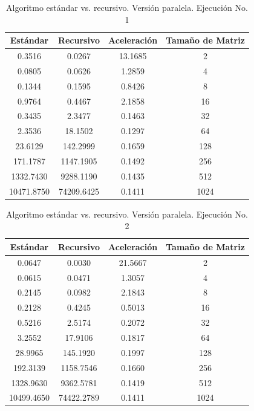 \documentclass{article}
\begin{document}
\begin{table}[ht]
\centering
\begin{tabular}{|c|c|c|c|}
\hline
\textbf{Estándar} & \textbf{Recursivo} & \textbf{Aceleración} & \textbf{Tamaño de Matriz} \\
\hline
0.3516 & 0.0267 & 13.1685 & 2 \\
0.0805 & 0.0626 & 1.2859 & 4 \\
0.1344 & 0.1595 & 0.8426 & 8 \\
0.9764 & 0.4467 & 2.1858 & 16 \\
0.3435 & 2.3477 & 0.1463 & 32 \\
2.3536 & 18.1502 & 0.1297 & 64 \\
23.6129 & 142.2999 & 0.1659 & 128 \\
171.1787 & 1147.1905 & 0.1492 & 256 \\
1332.7430 & 9288.1190 & 0.1435 & 512 \\
10471.8750 & 74209.6425 & 0.1411 & 1024 \\
\hline
\end{tabular}
\caption{Algoritmo estándar vs. recursivo. Versión paralela. Ejecución No. 1}
\end{table}

\begin{table}[ht]
\centering
\begin{tabular}{|c|c|c|c|}
\hline
\textbf{Estándar} & \textbf{Recursivo} & \textbf{Aceleración} & \textbf{Tamaño de Matriz} \\
\hline
0.0647 & 0.0030 & 21.5667 & 2 \\
0.0615 & 0.0471 & 1.3057 & 4 \\
0.2145 & 0.0982 & 2.1843 & 8 \\
0.2128 & 0.4245 & 0.5013 & 16 \\
0.5216 & 2.5174 & 0.2072 & 32 \\
3.2552 & 17.9106 & 0.1817 & 64 \\
28.9965 & 145.1920 & 0.1997 & 128 \\
192.3139 & 1158.7546 & 0.1660 & 256 \\
1328.9630 & 9362.5781 & 0.1419 & 512 \\
10499.4650 & 74422.2789 & 0.1411 & 1024 \\
\hline
\end{tabular}
\caption{Algoritmo estándar vs. recursivo. Versión paralela. Ejecución No. 2}
\end{table}
\end{document}
